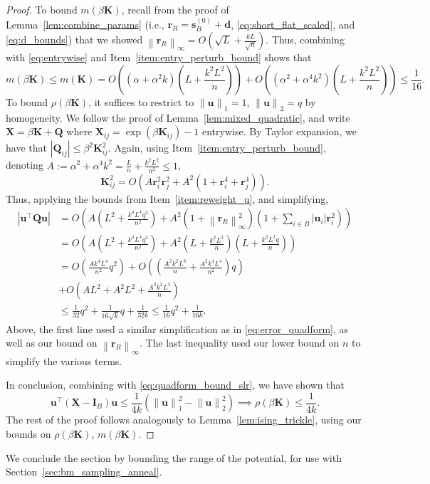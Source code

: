 \documentclass[11pt]{article}
\newcommand{\defeq}{:=}
\newcommand{\norm}[1]{\left\lVert#1\right\rVert}
\newcommand{\1}{\mathbf{1}}
\newcommand{\0}{\mathbf{0}}
\newcommand{\id}{\mathbf{I}}
\newcommand{\Par}[1]{\left(#1\right)}
\newcommand{\Abs}[1]{\left|#1\right|}
\newcommand{\mk}{{\mathbf{K}}}
\newcommand{\mq}{{\mathbf{Q}}}
\newcommand{\mx}{{\mathbf{X}}}
\newcommand{\vd}{{\mathbf{d}}}
\newcommand{\vr}{{\mathbf{r}}}
\newcommand{\vs}{{\mathbf{s}}}
\newcommand{\vu}{{\mathbf{u}}}
\begin{document}
\begin{proof}
To bound $m(\beta\mk)$, recall from the proof of Lemma~\ref{lem:combine_params} (i.e., $\vr_R = \vs_B^{(0)} + \vd$, \eqref{eq:short_flat_scaled}, and \eqref{eq:d_bounds}) that we showed $\norm{\vr_R}_\infty = O(\sqrt L + \frac{kL}{\sqrt n})$. Thus, combining with \eqref{eq:entrywise} and Item~\ref{item:entry_perturb_bound} shows that
\[m(\beta\mk) \le m(\mk) = O\Par{\Par{\alpha + \alpha^2 k}\Par{L + \frac{k^2L^2}{n}}} + O\Par{\Par{\alpha^2 + \alpha^4 k^2}\Par{L + \frac{k^2L^2}{n}}} \le \frac 1 {16}.\]
To bound $\rho(\beta\mk)$, it suffices to restrict to $\norm{\vu}_1 = 1$, $\norm{\vu}_2 = q$ by homogeneity. We follow the proof of Lemma~\ref{lem:mixed_quadratic}, and write $\mx = \beta\mk + \mq$ where $\mx_{ij} = \exp(\beta\mk_{ij}) - 1$ entrywise. By Taylor expansion, we have that $|\mq_{ij}| \le \beta^2\mk_{ij}^2$. Again, using Item~\ref{item:entry_perturb_bound}, denoting $A \defeq \alpha^2 + \alpha^4 k^2 = \frac L n + \frac{k^2 L^2}{n^2} \le 1$,
\[\mk_{ij}^2 = O\Par{A\vr_i^2\vr_j^2 + A^2\Par{1 + \vr_i^4 + \vr_j^4}}.\]
Thus, applying the bounds from Item~\ref{item:reweight_u}, and simplifying,
\begin{align*}\Abs{\vu^\top \mq \vu} &= O\Par{A\Par{L^2 + \frac{k^4 L^4q^2}{n^2}} + A^2\Par{1 + \norm{\vr_R}^2_\infty}\Par{1 + \sum_{i \in B} |\vu_i|\vr_i^2} } \\
&= O\Par{A\Par{L^2 + \frac{k^4 L^4q^2}{n^2}} + A^2\Par{L + \frac{k^2 L^2}{n}}\Par{L + \frac{k^2 L^2 q}{n}} } \\
&= O\Par{\frac{Ak^4L^4}{n^2} q^2} + O\Par{\Par{\frac{A^2 k^2 L^3}{n} + \frac{A^2 k^4 L^4}{n^2}}q} \\
&+ O\Par{AL^2 + A^2 L^2 + \frac{A^2 k^2 L^3}{n}} \\
&\le \frac{1}{32} q^2 + \frac 1 {16\sqrt k} q+ \frac 1 {32k} \le \frac 1 {16} q^2 + \frac 1 {16k}.
\end{align*}
Above, the first line used a similar simplification as in \eqref{eq:error_quadform}, as well as our bound on $\norm{\vr_R}_\infty$. 
The last inequality used our lower bound on $n$ to simplify the various terms.

In conclusion, combining with \eqref{eq:quadform_bound_slr}, we have shown that
\[\vu^\top \Par{\mx - \id_B} \vu \le \frac 1 {4k}\Par{\norm{\vu}_1^2 - \norm{\vu}_2^2} \implies \rho(\beta\mk) \le \frac 1 {4k} .\]
The rest of the proof follows analogously to Lemma~\ref{lem:ising_trickle}, using our bounds on $\rho(\beta\mk)$, $m(\beta\mk)$.
\end{proof}

We conclude the section by bounding the range of the potential, for use with Section~\ref{sec:bm_sampling_anneal}.
\end{document}

